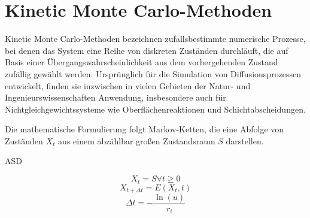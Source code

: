 \section{Kinetic Monte Carlo-Methoden}

Kinetic Monte Carlo-Methoden bezeichnen zufallsbestimmte numerische Prozesse, bei denen das System eine Reihe von diskreten Zuständen durchläuft, die auf Basis einer Übergangswahrscheinlichkeit aus dem vorhergehenden Zustand zufällig gewählt werden.
Ursprünglich für die Simulation von  Diffusionsprozessen entwickelt, finden sie inzwischen in vielen Gebieten der Natur- und Ingenieurswissenschaften Anwendung, insbesondere auch für Nichtgleichgewichtssysteme wie  Oberflächenreaktionen und Schichtabscheidungen.

Die mathematische Formulierung folgt Markov-Ketten, die eine Abfolge von Zuständen $X_t$ aus einem abzählbar großen Zustandsraum $S$ darstellen.

ASD

$$
X_t = S \forall t \geq 0
$$
$$
X_{t+\Delta t} = E(X_t, t)
$$
$$
\Delta t = - \frac{\ln(u)}{r_i}
$$

